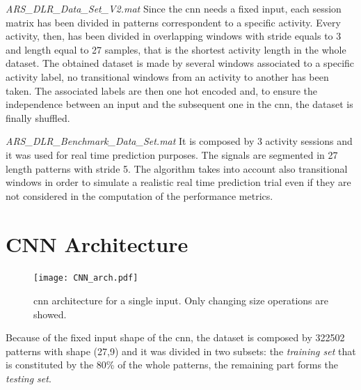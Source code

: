 \begin{LaTeXdescription}
	\item[\textit{ARS\_DLR\_Data\_Set\_V2.mat}]
		Since the \gls{cnn} needs a fixed input, each session matrix has been divided in patterns correspondent to a specific activity.
		Every activity, then, has been divided in overlapping windows with stride equals to 3 and length equal to 27 samples, that is the shortest activity length in the whole dataset. The obtained dataset is made by several windows associated to a specific activity label, no transitional windows from an activity to another has been taken. The associated labels are then one hot encoded and, to ensure the independence between an input and the subsequent one in the \gls{cnn}, the dataset is finally shuffled.

	\item[\textit{ARS\_DLR\_Benchmark\_Data\_Set.mat}]
		It is composed by 3 activity sessions and it was used for real time prediction purposes. The signals are segmented in 27 length patterns with stride 5. The algorithm takes into account also transitional windows in order to simulate a realistic real time prediction trial even if they are not considered in the computation of the performance metrics.
\end{LaTeXdescription}




\section{CNN Architecture}
\label{sec:cnn_architecture}
\begin{figure}[htp]
\texttt{[image: CNN\_arch.pdf]}
\caption{\gls{cnn} architecture for a single input. Only changing size operations are showed.}
\label{fig:CNN}
\end{figure}


Because of the fixed input shape of the \gls{cnn}, the dataset  is composed by 322502 patterns with shape (27,9) and it was divided in two subsets: the \textit{training set} that is constituted by the 80\% of the whole patterns, the remaining part forms the \textit{testing set}.

